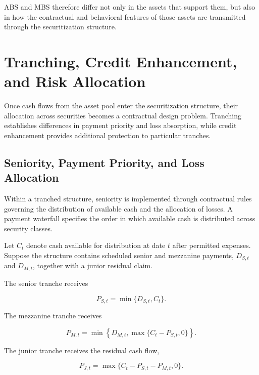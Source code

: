 ABS and MBS therefore differ not only in the assets that support them, but also in how the contractual and behavioral features of those assets are transmitted through the securitization structure.


\section[Tranching, Credit Enhancement, and Risk Allocation]{Tranching, Credit Enhancement, and Risk Allocation}

Once cash flows from the asset pool enter the securitization structure, their allocation across securities becomes a contractual design problem. Tranching establishes differences in payment priority and loss absorption, while credit enhancement provides additional protection to particular tranches.

\subsection{Seniority, Payment Priority, and Loss Allocation}

Within a tranched structure, seniority is implemented through contractual rules governing the distribution of available cash and the allocation of losses. A payment waterfall specifies the order in which available cash is distributed across security classes.

Let \(C_t\) denote cash available for distribution at date \(t\) after permitted expenses. Suppose the structure contains scheduled senior and mezzanine payments, \(D_{S,t}\) and \(D_{M,t}\), together with a junior residual claim.

The senior tranche receives

\begin{equation}
P_{S,t}
=
\min\{D_{S,t},C_t\}.
\label{eq:ch20-senior-waterfall}
\end{equation}

The mezzanine tranche receives

\begin{equation}
P_{M,t}
=
\min\left\{
D_{M,t},
\max\{C_t-P_{S,t},0\}
\right\}.
\label{eq:ch20-mezz-waterfall}
\end{equation}

The junior tranche receives the residual cash flow,

\begin{equation}
P_{J,t}
=
\max\{
C_t-P_{S,t}-P_{M,t},
0
\}.
\label{eq:ch20-junior-waterfall}
\end{equation}

